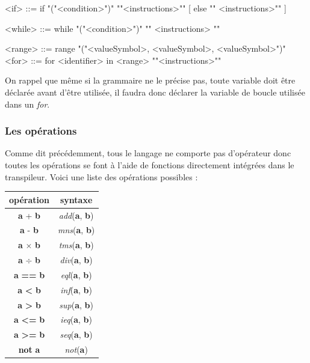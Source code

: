 \documentclass[a4paper]{article}%
\begin{document}
\begin{grammar}
<if> ::= if "("<condition>")" "{"<instructions>"}" [ else "{" <instructions>"}" ]

<while> ::= while "("<condition>")" "{" <instructions> "}"

<range> ::= range "("<valueSymbol>, <valueSymbol>, <valueSymbol>")"
<for> ::= for <identifier> in <range> "{"<instructions>"}"
\end{grammar}\leavevmode\newline

On rappel que même si la grammaire ne le précise pas, toute variable doit être
déclarée avant d'être utilisée, il faudra donc déclarer la variable de boucle
utilisée dans un \textit{for}.

\subsubsection*{Les opérations}

Comme dit précédemment, tous le langage ne comporte pas d'opérateur donc toutes
les opérations se font à l'aide de fonctions directement intégrées dans le
transpileur. Voici une liste des opérations possibles :

\begin{center}
\begin{tabular}{ | c | c | }
    \hline
    opération & syntaxe\\
    \hline
    \textbf{a} + \textbf{b} & \textit{add}(\textbf{a}, \textbf{b})\\
    \hline
    \textbf{a} - \textbf{b} & \textit{mns}(\textbf{a}, \textbf{b})\\
    \hline
    \textbf{a} $\times$ \textbf{b} & \textit{tms}(\textbf{a}, \textbf{b})\\
    \hline
    \textbf{a} $\div$ \textbf{b} & \textit{div}(\textbf{a}, \textbf{b})\\
    \hline
    \textbf{a} \textbf{==} \textbf{b} & \textit{eql}(\textbf{a}, \textbf{b})\\
    \hline
    \textbf{a} \textbf{<} \textbf{b} & \textit{inf}(\textbf{a}, \textbf{b})\\
    \hline
    \textbf{a} \textbf{>} \textbf{b} & \textit{sup}(\textbf{a}, \textbf{b})\\
    \hline
    \textbf{a} \textbf{<=} \textbf{b} & \textit{ieq}(\textbf{a}, \textbf{b})\\
    \hline
    \textbf{a} \textbf{>=} \textbf{b} & \textit{seq}(\textbf{a}, \textbf{b})\\
    \hline
    \textbf{not} \textbf{a} & \textit{not}(\textbf{a})\\
    \hline
\end{tabular}
\end{center}
\end{document}
